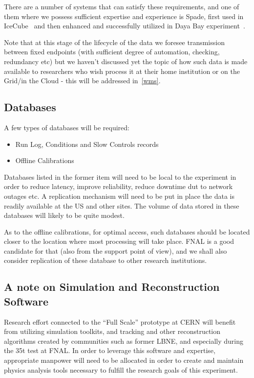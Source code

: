There are a number of systems that can satisfy these requirements, and one of them where we possess sufficient expertise and experience is Spade, first used in IceCube~\cite{spade_icecube} and then enhanced and successfully utilized in Daya Bay experiment~\cite{spade_dayabay}.

Note that at this stage of the lifecycle of the data we foresee transmission between fixed endpoints (with sufficient degree of automation, checking, redundancy etc) but we haven't discussed yet the topic of how such
data is made available to researchers who wish process it at their home institution or on the Grid/in the Cloud - this will be addressed in~\ref{wms}.


\subsection{Databases}
A few types of databases will be required:
\begin{itemize}
\item Run Log, Conditions and Slow Controls records
\item Offline Calibrations
\end{itemize}

Databases listed in the former item will need to be local to the experiment in order to reduce latency, improve reliability, reduce downtime dut to
network outages etc.
A replication mechanism will need to be put in place the data is readily available at the US and other sites. The volume of data
stored in these databases will likely to be quite modest.

As to the offline calibrations, for optimal access, such databases should be located closer to the location where most processing will take place.
FNAL is a good candidate for that (also from the support point of view), and we shall also consider replication of these database to other
research institutions.

\subsection{A note on Simulation and Reconstruction Software}
Research effort connected to the ``Full Scale'' prototype at CERN will benefit from utilizing simulation toolkits, and tracking and other reconstruction
algorithms created by communities such as former LBNE, and especially during the 35t test at FNAL. In order to leverage this
software and expertise, appropriate manpower will need to be allocated in order to create and maintain physics analysis tools
necessary to fulfill the research goals of this experiment.


